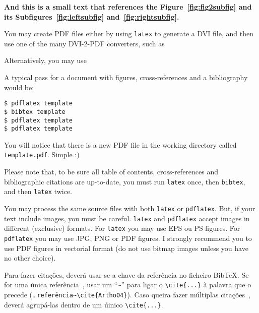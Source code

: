 \textbf{And this is a small text that references the Figure~\ref{fig:fig2subfig} and its Subfigures~\ref{fig:leftsubfig} and~\ref{fig:rightsubfig}.}

\lipsum[1-3]





You may create PDF files either by using \verb!latex! to generate a DVI file, and then use one of the many DVI-2-PDF converters, such as %

Alternatively, you may use %

A typical pass for a document with figures, cross-references and a bibliography would be:
\begin{verbatim}
$ pdflatex template
$ bibtex template
$ pdflatex template
$ pdflatex template
\end{verbatim}
You will notice that there is a new PDF file in the working directory called \verb!template.pdf!. Simple :)

Please note that, to be sure all table of contents, cross-references and bibliographic citations are up-to-date, you must run \verb!latex! once, then \verb!bibtex!, and then \verb!latex! twice.



You may process the same source files with both \verb!latex! or \verb!pdflatex!. But, if your text include images, you must be careful. \verb!latex! and \verb!pdflatex! accept images in different (exclusive) formats.  For \verb!latex! you may use EPS ou PS figures. For \verb!pdflatex! you may use JPG, PNG or PDF figures.  I strongly recommend you to use PDF figures in vectorial format (do not use bitmap images unless you have no other choice).




Para fazer citações, deverá usar-se a chave da referência no ficheiro BibTeX. Se for uma única referência~\cite{Artho04}, usar um ``\verb!~!'' para ligar o \verb!\cite{...}! à palavra que o precede (\ldots\verb!referência~\cite{Artho04}!).  Caso queira fazer múltiplas citações~\cite{Shavit95,Silberschatz06,Moss85}, deverá agrupá-las dentro de um úinico \verb!\cite{...}!.

